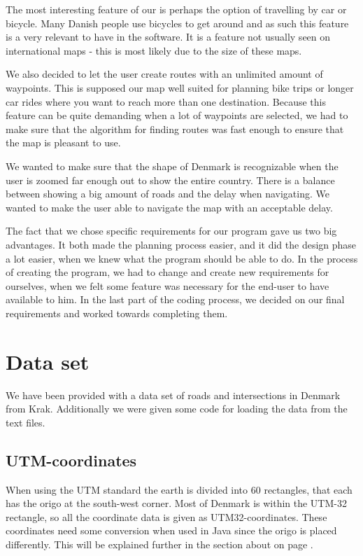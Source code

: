 The most interesting feature of our  is perhaps the
option of travelling by car or bicycle. Many Danish
people use bicycles to get around and as such this feature is a very relevant
to have in the software. It is a feature not usually seen on
international maps - this is most likely due to the size of these maps.

We also decided to let the user create routes with an unlimited amount of
waypoints. This is supposed our map well suited for planning bike trips or
longer car rides where you want to reach more than one destination. Because this
feature can be quite demanding when a lot of waypoints are selected, we had to
make sure that the algorithm for finding routes was fast enough to ensure that the 
map is pleasant to use.

We wanted to make sure that the shape of Denmark is recognizable when
the user is zoomed far enough out to show the entire country. There is a balance between
showing a big amount of roads and the delay when navigating. We wanted to make
the user able to navigate the map with an acceptable delay. 

The fact that we chose specific requirements for our program gave us two big
advantages. It both made the planning process easier, and it did the design phase a lot 
easier, when we knew what the program should be able to do. In the process of creating the
program, we had to change and create new requirements for ourselves, when we
felt some feature was necessary for the end-user to have available to him. In
the last part of the coding process, we decided on our final requirements and worked towards completing them. 

\section{Data set}
\label{BG-DS}
We have been provided with a data set of roads and intersections in Denmark 
from Krak. Additionally we were given some code for loading the data from the 
text files.

\subsection{UTM-coordinates}
\label{BG-DS-UTM}
When using the UTM standard the earth is divided into 60 rectangles, that each 
has the origo at the south-west corner. Most of Denmark is within the UTM-32 
rectangle, so all the coordinate data is given as UTM32-coordinates.
These coordinates need some conversion when used in Java since the origo is placed 
differently. This will be explained further in the section about 
on page \pageref{IMPL-UTM}.


